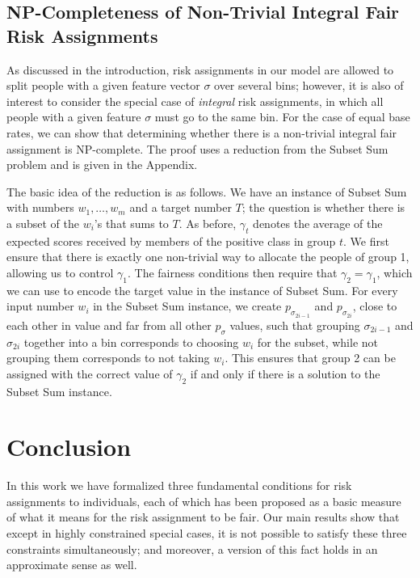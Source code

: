 \documentclass[11pt]{article}
\begin{document}
\subsection{NP-Completeness of Non-Trivial Integral Fair Risk Assignments}

As discussed in the introduction, 
risk assignments in our model are allowed to split 
people with a given feature vector $\sigma$ over several bins;
however, it is also of interest to consider the special case
of {\em integral} risk assignments,
in which all people with a given feature $\sigma$ must go to the same bin.
For the case of equal base rates, we can show that determining
whether there is a non-trivial integral fair assignment is NP-complete.
The proof uses a reduction from the Subset Sum problem 
and is given in the Appendix.


The basic idea of the reduction is as follows. 
We have an instance of Subset Sum with numbers
$w_1, \ldots, w_m$ and a target number $T$; the question 
is whether there is a subset of the $w_i$'s that sums to $T$.
As before, $\gamma_t$ denotes the average of the expected scores received by
members of the positive class in group $t$.
We first ensure that there is
exactly one non-trivial way to allocate the people of group 1, allowing
us to control $\gamma_1$. The fairness conditions then require that
$\gamma_2 = \gamma_1$, which we can use to encode the target value in
the instance of Subset Sum. For every input number $w_i$
in the Subset Sum instance, we
create $p_{\sigma_{2i-1}}$ and $p_{\sigma_{2i}}$, close to each other
in value and far from all other $p_\sigma$ values, such that grouping
$\sigma_{2i-1}$ and $\sigma_{2i}$ together into a bin corresponds to
choosing $w_i$ for the subset, while not grouping them corresponds to not
taking $w_i$. This ensures that group 2 can be assigned
with the correct value of $\gamma_2$ if and only if there is a
solution to the Subset Sum instance.


\section{Conclusion}

In this work we have formalized three fundamental conditions for
risk assignments to individuals, each of which has been proposed as
a basic measure of what it means for the risk assignment to be fair.
Our main results show that except in highly constrained special cases,
it is not possible to satisfy these three constraints simultaneously;
and moreover, a version of this fact holds in an approximate sense as well.
\end{document}
